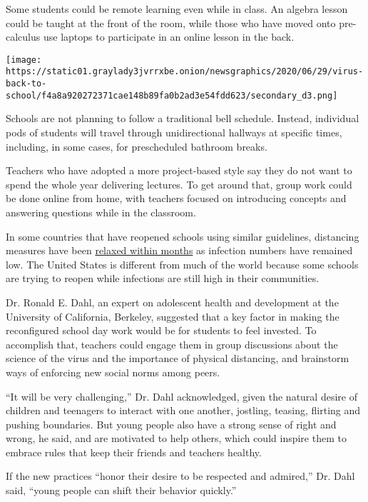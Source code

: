 Some students could be remote learning even while in class. An algebra
lesson could be taught at the front of the room, while those who have
moved onto pre-calculus use laptops to participate in an online lesson
in the back.

\texttt{[image: https://static01.graylady3jvrrxbe.onion/newsgraphics/2020/06/29/virus-back-to-school/f4a8a920272371cae148b89fa0b2ad3e54fdd623/secondary\_d3.png]}

Schools are not planning to follow a traditional bell schedule. Instead,
individual pods of students will travel through unidirectional hallways
at specific times, including, in some cases, for prescheduled bathroom
breaks.

Teachers who have adopted a more project-based style say they do not
want to spend the whole year delivering lectures. To get around that,
group work could be done online from home, with teachers focused on
introducing concepts and answering questions while in the classroom.

In some countries that have reopened schools using similar guidelines,
distancing measures have been
\href{https://www.washingtonpost.com/world/europe/schools-reopening-coronavirus/2020/07/10/865fb3e6-c122-11ea-8908-68a2b9eae9e0_story.html}{relaxed
within months} as infection numbers have remained low. The United States
is different from much of the world because some schools are trying to
reopen while infections are still high in their communities.

Dr. Ronald E. Dahl, an expert on adolescent health and development at
the University of California, Berkeley, suggested that a key factor in
making the reconfigured school day work would be for students to feel
invested. To accomplish that, teachers could engage them in group
discussions about the science of the virus and the importance of
physical distancing, and brainstorm ways of enforcing new social norms
among peers.

``It will be very challenging,'' Dr. Dahl acknowledged, given the
natural desire of children and teenagers to interact with one another,
jostling, teasing, flirting and pushing boundaries. But young people
also have a strong sense of right and wrong, he said, and are motivated
to help others, which could inspire them to embrace rules that keep
their friends and teachers healthy.

If the new practices ``honor their desire to be respected and admired,''
Dr. Dahl said, ``young people can shift their behavior quickly.''

